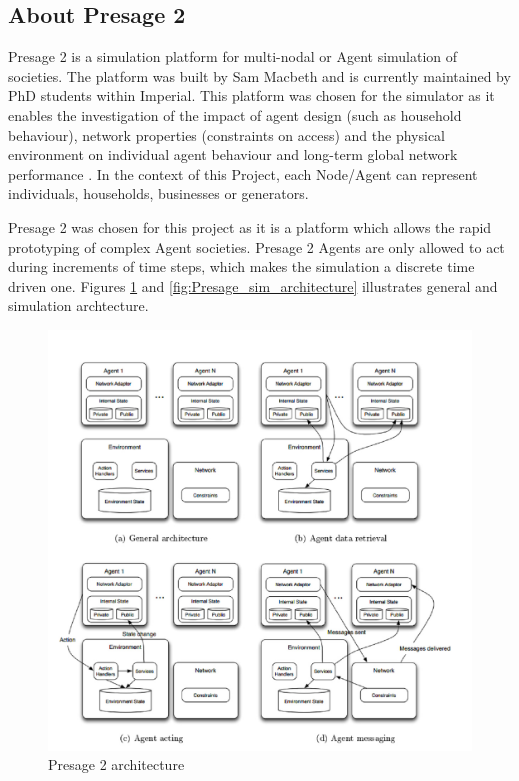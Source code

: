\subsection*{About Presage 2}
Presage 2 is a simulation platform for multi-nodal or Agent simulation of societies. The platform was built by Sam Macbeth and is currently maintained by PhD students within Imperial. This platform was chosen for the simulator as it enables the investigation of the impact of agent design (such as household behaviour), network properties (constraints on access) and the physical environment on individual agent behaviour and long-term global network performance \cite{Presage2-Desc:2015}. In the context of this Project, each Node/Agent can represent individuals, households, businesses or generators. 

Presage 2 was chosen for this project as it is a platform which allows the rapid prototyping of complex Agent societies. Presage 2 Agents are only allowed to act during increments of time steps, which makes the simulation a discrete time driven one. Figures \ref{fig:Presage_architecture} and \ref{fig:Presage_sim_architecture} illustrates general and simulation archtecture.

\begin{figure}[h!]
	\centering
	\includegraphics[scale=0.25]{Images/Presage.jpg}
	\caption{Presage 2 architecture \cite{Presage_Kyoto:2015}}
	\label{fig:Presage_architecture}
\end{figure}

